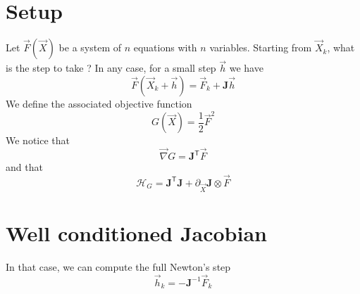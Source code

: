 \documentclass[aps,twocolumn]{revtex4}
\newcommand{\mymat}[1]{\boldsymbol{#1}}
\newcommand{\mytrn}[1]{{#1}^{\mathsf{T}}}
\newcommand{\mygrad}{\vec{\nabla}}
\newcommand{\myhess}{\mathcal{H}}
\begin{document}
\section{Setup}
Let $\vec{F}\left(\vec{X}\right)$ be a system of $n$ equations with $n$ variables.
Starting from $\vec{X}_k$, what is the step to take ?
In any case, for a small step $\vec{h}$ we have
\begin{equation}
	\vec{F}\left(\vec{X}_k+\vec{h}\right) = \vec{F}_k + \mymat{J} \vec{h}
\end{equation}
We define the associated objective function
\begin{equation}
	G\left(\vec{X}\right) = \frac{1}{2} \vec{F}^2
\end{equation}
We notice that
\begin{equation}
	\mygrad G = \mytrn{\mymat{J}}\vec{F}
\end{equation}
and that
\begin{equation}
	\myhess_G = \mytrn{\mymat{J}}\mymat{J} + \partial_{\vec{X}}\mymat{J} \otimes \vec{F}
\end{equation}

\section{Well conditioned Jacobian}
In that case, we can compute the full Newton's step
\begin{equation}
	\vec{h}_k = - \mymat{J}^{-1} \vec{F}_k
\end{equation}
\end{document}
